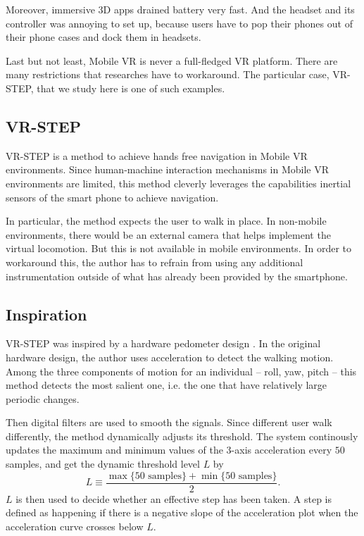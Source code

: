 \documentclass[11pt]{amsart}
\begin{document}
Moreover, immersive 3D apps drained battery very fast. And the headset and its controller was annoying to set up, because users have to pop their phones out of their phone cases and dock them in headsets.

Last but not least, Mobile VR is never a full-fledged VR platform. There are many restrictions that researches have to workaround. The particular case, VR-STEP, that we study here is one of such examples.

\subsection{VR-STEP}
VR-STEP \cite{Tregillus:2016:VWU:2858036.2858084} is a method to achieve hands free navigation in Mobile VR environments. Since human-machine interaction mechanisms in Mobile VR environments are limited, this method cleverly leverages the capabilities inertial sensors of the smart phone to achieve navigation.

In particular, the method expects the user to walk in place. In non-mobile environments, there would be an external camera that helps implement the virtual locomotion. But this is not available in mobile environments. In order to workaround this, the author has to refrain from using any additional instrumentation outside of what has already been provided by the smartphone.

\subsection{Inspiration}
VR-STEP was inspired by a hardware pedometer design \cite{zhao2010full}. In the original hardware design, the author uses acceleration to detect the walking motion. Among the three components of motion for an individual -- roll, yaw, pitch -- this method detects the most salient one, i.e. the one that have relatively large periodic changes.

Then digital filters are used to smooth the signals. Since different user walk differently, the method dynamically adjusts its threshold. The system continously updates the maximum and minimum values of the 3-axis acceleration every $50$ samples, and get the dynamic threshold level $L$ by\[
L\equiv\frac{\max\{\text{50 samples}\}+\min\{\text{50 samples}\}}{2}.
\]$L$ is then used to decide whether an effective step has been taken. A step is defined as happening if there is a negative slope of the acceleration plot when the acceleration curve crosses below $L$.
\end{document}
